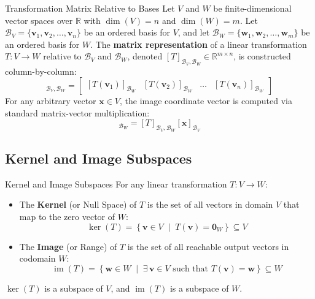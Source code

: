 \begin{definitionbox}{Transformation Matrix Relative to Bases}
Let $V$ and $W$ be finite-dimensional vector spaces over $\mathbb{R}$ with $\dim(V) = n$ and $\dim(W) = m$. Let $\mathcal{B}_V = \{\mathbf{v}_1, \mathbf{v}_2, \dots, \mathbf{v}_n\}$ be an ordered basis for $V$, and let $\mathcal{B}_W = \{\mathbf{w}_1, \mathbf{w}_2, \dots, \mathbf{w}_m\}$ be an ordered basis for $W$.
The \textbf{matrix representation} of a linear transformation $T: V \to W$ relative to $\mathcal{B}_V$ and $\mathcal{B}_W$, denoted $[T]_{\mathcal{B}_V, \mathcal{B}_W} \in \mathbb{R}^{m \times n}$, is constructed column-by-column:
\begin{equation}
[T]_{\mathcal{B}_V, \mathcal{B}_W} = \begin{bmatrix} [T(\mathbf{v}_1)]_{\mathcal{B}_W} & [T(\mathbf{v}_2)]_{\mathcal{B}_W} & \dots & [T(\mathbf{v}_n)]_{\mathcal{B}_W} \end{bmatrix}
\end{equation}
For any arbitrary vector $\mathbf{x} \in V$, the image coordinate vector is computed via standard matrix-vector multiplication:
\begin{equation}
[T(\mathbf{x})]_{\mathcal{B}_W} = [T]_{\mathcal{B}_V, \mathcal{B}_W} [\mathbf{x}]_{\mathcal{B}_V}
\end{equation}
\end{definitionbox}

\subsection{Kernel and Image Subspaces}

\begin{definitionbox}{Kernel and Image Subspaces}
 
For any linear transformation $T: V \to W$:
\begin{itemize}
    \item The \textbf{Kernel} (or Null Space) of $T$ is the set of all vectors in domain $V$ that map to the zero vector of $W$:
    \begin{equation}
    \ker(T) = \left\{ \mathbf{v} \in V \;\middle|\; T(\mathbf{v}) = \mathbf{0}_W \right\} \subseteq V
    \end{equation}
    \item The \textbf{Image} (or Range) of $T$ is the set of all reachable output vectors in codomain $W$:
    \begin{equation}
    \operatorname{im}(T) = \left\{ \mathbf{w} \in W \;\middle|\; \exists \, \mathbf{v} \in V \text{ such that } T(\mathbf{v}) = \mathbf{w} \right\} \subseteq W
    \end{equation}
\end{itemize}
$\ker(T)$ is a subspace of $V$, and $\operatorname{im}(T)$ is a subspace of $W$.
\end{definitionbox}

